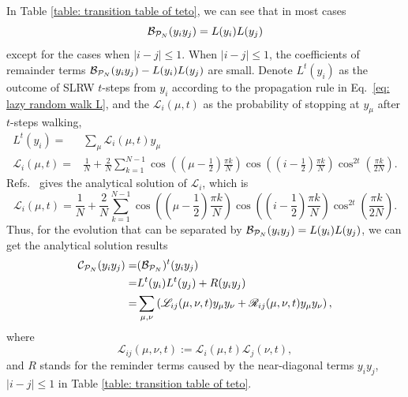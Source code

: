\documentclass[showpacs,onecolumn,aps,prx,long bibliography,superscriptaddress,notitlepage]{revtex4-1}
\begin{document}
In Table \ref{table: transition table of teto}, we can see that in most cases 
\begin{equation}
    \mathcal{B}_{\mathcal{P}_N}(y_i y_j) = L(y_i) L(y_j)
\end{equation}
except for the cases when $|i-j|\leq 1$. 
When $|i-j|\leq 1$, the coefficients of remainder terms $\mathcal{B}_{\mathcal{P}_N}(y_i y_j) - L(y_i)L(y_j)$ are small. 
Denote $L^t(y_i)$ as the outcome of SLRW $t$-steps from $y_i$ according to the propagation rule in Eq.~\eqref{eq: lazy random walk L}, and the $\mathcal{L}_{i}(\mu, t)$ as the probability of stopping at $y_\mu$ after $t$-steps walking,
\begin{equation}
    \begin{aligned}
    L^t(y_i) =& \sum_\mu \mathcal{L}_{i}(\mu, t) y_\mu \\
        \mathcal{L}_{i}(\mu, t) =& \frac{1}{N} + \frac{2}{N} \sum_{k=1}^{N-1} \cos \left(\left(\mu-\frac{1}{2}\right) \frac{\pi k}{N}\right) \cos \left(\left(i-\frac{1}{2}\right) \frac{\pi k}{N}\right) \cos^{2 t} \left(\frac{\pi k}{2 N}\right).
    \end{aligned}
\end{equation}
Refs.~\cite{giuggioli2020exact} gives the analytical solution of $\mathcal{L}_{i}$, which is 
\begin{equation}
    \mathcal{L}_{i}(\mu, t) = \frac{1}{N} + \frac{2}{N} \sum_{k=1}^{N-1} \cos \left(\left(\mu-\frac{1}{2}\right) \frac{\pi k}{N}\right) \cos \left(\left(i-\frac{1}{2}\right) \frac{\pi k}{N}\right) \cos^{2 t} \left(\frac{\pi k}{2 N}\right).
\end{equation}
Thus, for the evolution that can be separated by $\mathcal{B}_{\mathcal{P}_N}(y_iy_j) = L(y_i) L(y_j)$, we can get the analytical solution results
\begin{align}
    \mathcal{C}_{\mathcal{P}_N} (y_i y_j) =& (\mathcal{B}_{\mathcal{P}_N})^t (y_i y_j) \\
    =& L^t(y_i)L^t(y_j) + R(y_iy_j)\\
    \label{eq: zz anonymous 7}
    =&\sum_{\mu,\nu} \left(\mathscr{L}_{ij} (\mu, \nu, t) y_\mu y_\nu + \mathscr{R}_{ij} (\mu, \nu, t) y_\mu y_\nu\right),
\end{align}
where
\begin{equation}
    \mathscr{L}_{ij} (\mu, \nu, t) := \mathcal{L}_{i}(\mu, t)\mathcal{L}_{j}(\nu, t),
    \label{eq:L_ij_deviation}
\end{equation}
and $R$ stands for the reminder terms caused by the near-diagonal terms $y_i y_j$, $|i-j| \leq 1$ in Table \ref{table: transition table of teto}. 
\end{document}
